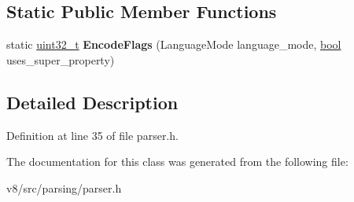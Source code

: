 \subsection*{Static Public Member Functions}
\begin{DoxyCompactItemize}
\item 
\mbox{\label{classv8_1_1internal_1_1FunctionEntry_af116c23ac6b112b66d0c3cca5936cc4f}} 
static \mbox{\hyperlink{classuint32__t}{uint32\+\_\+t}} {\bfseries Encode\+Flags} (Language\+Mode language\+\_\+mode, \mbox{\hyperlink{classbool}{bool}} uses\+\_\+super\+\_\+property)
\end{DoxyCompactItemize}


\subsection{Detailed Description}


Definition at line 35 of file parser.\+h.



The documentation for this class was generated from the following file\+:\begin{DoxyCompactItemize}
\item 
v8/src/parsing/parser.\+h\end{DoxyCompactItemize}
